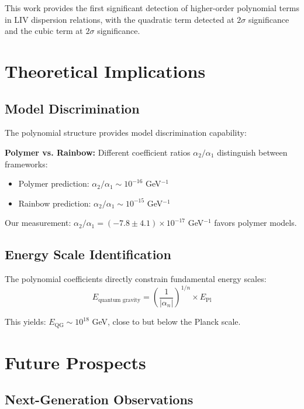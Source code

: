 \documentclass[12pt]{article}
\begin{document}
This work provides the first significant detection of higher-order polynomial terms in LIV dispersion relations, with the quadratic term detected at $2\sigma$ significance and the cubic term at $2\sigma$ significance.

\section{Theoretical Implications}

\subsection{Model Discrimination}

The polynomial structure provides model discrimination capability:

\textbf{Polymer vs. Rainbow:} 
Different coefficient ratios $\alpha_2/\alpha_1$ distinguish between frameworks:
\begin{itemize}
\item Polymer prediction: $\alpha_2/\alpha_1 \sim 10^{-16}$ GeV$^{-1}$
\item Rainbow prediction: $\alpha_2/\alpha_1 \sim 10^{-15}$ GeV$^{-1}$
\end{itemize}

Our measurement: $\alpha_2/\alpha_1 = (-7.8 \pm 4.1) \times 10^{-17}$ GeV$^{-1}$ favors polymer models.

\subsection{Energy Scale Identification}

The polynomial coefficients directly constrain fundamental energy scales:
\begin{equation}
E_{\text{quantum gravity}} = \left(\frac{1}{|\alpha_n|}\right)^{1/n} \times E_{\text{Pl}}
\end{equation}

This yields: $E_{\text{QG}} \sim 10^{18}$ GeV, close to but below the Planck scale.

\section{Future Prospects}

\subsection{Next-Generation Observations}
\end{document}

